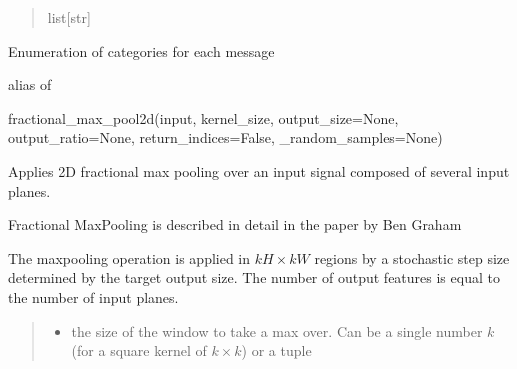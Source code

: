 \documentclass[letterpaper,10pt,english]{sphinxmanual}
\begin{document}
\begin{fulllineitems}
\begin{fulllineitems}
\begin{quote}
\begin{description}
\sphinxAtStartPar
list{[}str{]}

\end{description}\end{quote}

\end{fulllineitems}


\begin{fulllineitems}
\label{\detokenize{filters:filters.string_filter.StringFilter.filter_result}}
\pysigstartsignatures
{}
\pysigstopsignatures
\sphinxAtStartPar
Enumeration of categories for each message

\sphinxAtStartPar
alias of 

\end{fulllineitems}


\begin{fulllineitems}
\label{\detokenize{filters:filters.string_filter.StringFilter.fix_text}}
\pysigstartsignatures
{}
\pysigstopsignatures
\sphinxAtStartPar
fractional\_max\_pool2d(input, kernel\_size, output\_size=None, output\_ratio=None, return\_indices=False, \_random\_samples=None)

\sphinxAtStartPar
Applies 2D fractional max pooling over an input signal composed of several input planes.

\sphinxAtStartPar
Fractional MaxPooling is described in detail in the paper  by Ben Graham

\sphinxAtStartPar
The max\sphinxhyphen{}pooling operation is applied in \(kH \times kW\) regions by a stochastic
step size determined by the target output size.
The number of output features is equal to the number of input planes.
\begin{quote}\begin{description}
\begin{itemize}
\item {} 
\sphinxAtStartPar
{} \textendash{} the size of the window to take a max over.
Can be a single number \(k\) (for a square kernel of \(k \times k\))
or a tuple 


\end{itemize}
\end{description}
\end{quote}
\end{fulllineitems}
\end{fulllineitems}
\end{document}
